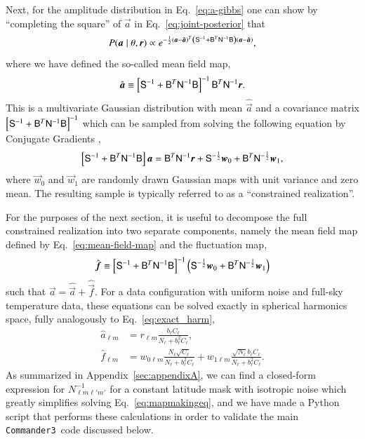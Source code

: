 \documentclass[twocolumn]{aa}
\def\commanderthree{\texttt{Commander3}}
\newcommand{\B}[0]{\tens{B}}
\renewcommand{\a}[0]{\vec{a}}
\newcommand{\f}[0]{\vec{f}}
\newcommand{\N}[0]{\tens{N}}
\newcommand{\w}[0]{\vec{w}}
\renewcommand{\S}[0]{\tens{S}}
\renewcommand{\r}[0]{\vec{r}}
\begin{document}
Next, for the amplitude distribution in Eq.~\eqref{eq:a-gibbs} one can show by ``completing the square'' of $\a$ in Eq.~\eqref{eq:joint-posterior} that 
\begin{equation}
    P(\a \mid \theta, \r) \propto e^{-\frac12 \left(\a - \hat{\a}\right)^T \left(\S^{-1} + \B^T\N^{-1}\B\right) \left(\a - {\hat{\a}}\right)},
\end{equation}
where we have defined the so-called mean field map,
\begin{equation}
\label{eq:mean-field-map}
\hat{\a} \equiv \left[\S^{-1} + \B^T \N^{-1}\B \right]^{-1} \B^T \N^{-1} \r.
\end{equation}
This is a multivariate Gaussian distribution with mean $\hat{\a}$ and a covariance matrix $\left[\S^{-1} + \B^T \N^{-1}\B \right]^{-1}$ which can be sampled from solving the following equation by Conjugate Gradients \citep{shewchuk:1994,seljebotn:2019},
\begin{equation}
    \label{eq:mapmakingeq}
    \left[\S^{-1} + \B^T \N^{-1}\B \right]\a = \B^T \N^{-1} \r + \S^{-\frac{1}{2}}\w_0 +\B^T \N^{-\frac{1}{2}}\w_1,
\end{equation}
where $\w_0$ and $\w_1$ are randomly drawn Gaussian maps with unit variance and zero mean. The resulting sample is typically referred to as a ``constrained realization''.

For the purposes of the next section, it is useful to decompose the full constrained realization into two separate components, namely the mean field map defined by Eq.~\eqref{eq:mean-field-map} and the fluctuation map, 
\begin{equation}
\label{eq:fluc-map}
\hat{\f} \equiv \left[\S^{-1} + \B^T \N^{-1}\B \right]^{-1} \left(\S^{-\frac{1}{2}}\w_0 +\B^T \N^{-\frac{1}{2}}\w_1 \right)
\end{equation}
such that $\a = \hat{\a} + \hat{\f}$. For a data configuration with uniform noise and full-sky temperature data, these equations can be solved exactly in spherical harmonics space, fully analogously to Eq.~\eqref{eq:exact_harm},
\begin{align}
    \label{eq:hat_s_approx}
    \hat{a}_{\ell m} &= r_{\ell m}\frac{b_{\ell}C_{\ell}}{N_\ell + b_{\ell}^2C_{\ell}},\\
    \label{eq:hat_f_approx}
    \hat{f}_{\ell m} &= w_{0\ell m}\frac{N_{\ell}\sqrt{C_{\ell}}}{N_\ell + b_{\ell}^2C_{\ell}}+w_{1\ell m}\frac{\sqrt{N_{\ell}}b_{\ell}C_\ell}{N_\ell + b_{\ell}^2C_{\ell}}.
\end{align}
As summarized in 
Appendix~\ref{sec:appendixA}, we can find a closed-form expression for $N_{\ell m\ell'm'}^{-1}$ for a constant latitude mask with isotropic noise which greatly simplifies solving Eq.~\eqref{eq:mapmakingeq}, and we have made a Python script that performs these calculations in order to validate the main \commanderthree\ code discussed below.
\end{document}
